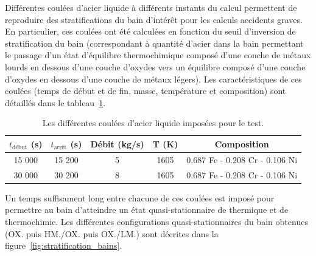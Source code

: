 Différentes coulées d'acier liquide à différents instants du calcul permettent de reproduire des stratifications du bain d'intérêt pour les calculs accidents graves. En particulier, ces coulées ont été calculées en fonction du seuil d'inversion de stratification du bain (correspondant à quantité d'acier dans la bain permettant le passage d'un état d'équilibre thermochimique composé d'une couche de métaux lourds en dessous d'une couche d'oxydes vers un équilibre composé d'une couche d'oxydes en dessous d'une couche de métaux légers). Les caractéristiques de ces coulées (temps de début et de fin, masse, température et composition) sont détaillés dans le tableau~\ref{tab:coulees_acier}. 
\begin{table}
	\centering
	\begin{tabular}{ccccc} 
	\hline
	$t_{\text{début}}$ (s) &  $t_{\text{arrêt}}$ (s) & Débit (kg/s) & T (K) & Composition\\
	\hline
	15 000 & 15 200 & 5 & 1605 & 0.687 Fe - 0.208 Cr - 0.106 Ni\\
	30 000 & 30 200 & 8 & 1605 & 0.687 Fe - 0.208 Cr - 0.106 Ni\\
	\hline
	\end{tabular}	
	\caption{Les différentes coulées d'acier liquide imposées pour le test.} 
	\label{tab:coulees_acier}
\end{table}
Un temps suffisament long entre chacune de ces coulées est imposé pour permettre au bain d'atteindre un état quasi-stationnaire de thermique et de thermochimie. Les différentes configurations quasi-stationnaires du bain obtenues (OX. puis HM./OX. puis OX./LM.) sont décrites dans la figure~\ref{fig:stratification_bains}.
